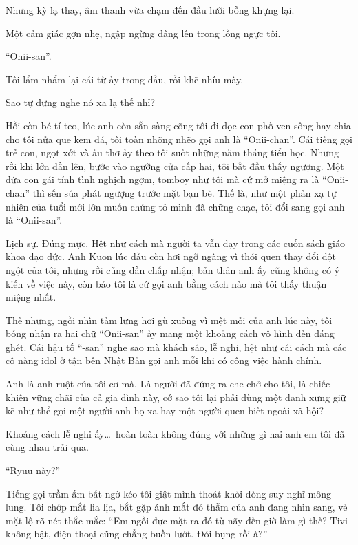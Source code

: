 ﻿\documentclass[../main.tex]{subfiles}
\begin{document}
Nhưng kỳ lạ thay, âm thanh vừa chạm đến đầu lưỡi bỗng khựng lại.

Một cảm giác gợn nhẹ, ngập ngừng dâng lên trong lồng ngực tôi.

``Onii-san''.

Tôi lẩm nhẩm lại cái từ ấy trong đầu, rồi khẽ nhíu mày.

Sao tự dưng nghe nó xa lạ thế nhỉ?

Hồi còn bé tí teo, lúc anh còn sẵn sàng cõng tôi đi dọc con phố ven sông hay chia cho tôi nửa que kem đá, tôi toàn nhõng nhẽo gọi anh là ``Onii-chan''. Cái tiếng gọi trẻ con, ngọt xớt và ấu thơ ấy theo tôi suốt những năm tháng tiểu học. Nhưng rồi khi lớn dần lên, bước vào ngưỡng cửa cấp hai, tôi bắt đầu thấy ngượng. Một đứa con gái tính tình nghịch ngợm, tomboy như tôi mà cứ mở miệng ra là ``Onii-chan'' thì sến súa phát ngượng trước mặt bạn bè. Thế là, như một phản xạ tự nhiên của tuổi mới lớn muốn chứng tỏ mình đã chững chạc, tôi đổi sang gọi anh là ``Onii-san''.

Lịch sự. Đúng mực. Hệt như cách mà người ta vẫn dạy trong các cuốn sách giáo khoa đạo đức. Anh Kuon lúc đầu còn hơi ngỡ ngàng vì thói quen thay đổi đột ngột của tôi, nhưng rồi cũng dần chấp nhận; bản thân anh ấy cũng không có ý kiến về việc này, còn bảo tôi là cứ gọi anh bằng cách nào mà tôi thấy thuận miệng nhất.

Thế nhưng, ngồi nhìn tấm lưng hơi gù xuống vì mệt mỏi của anh lúc này, tôi bỗng nhận ra hai chữ ``Onii-san'' ấy mang một khoảng cách vô hình đến đáng ghét. Cái hậu tố ``-san'' nghe sao mà khách sáo, lễ nghi, hệt như cái cách mà các cô nàng idol ở tận bên Nhật Bản gọi anh mỗi khi có công việc hành chính.

Anh là anh ruột của tôi cơ mà. Là người đã đứng ra che chở cho tôi, là chiếc khiên vững chãi của cả gia đình này, cớ sao tôi lại phải dùng một danh xưng giữ kẽ như thể gọi một người anh họ xa hay một người quen biết ngoài xã hội?

Khoảng cách lễ nghi ấy\dots\ hoàn toàn không đúng với những gì hai anh em tôi đã cùng nhau trải qua.

\ct

``Ryuu này?''

Tiếng gọi trầm ấm bất ngờ kéo tôi giật mình thoát khỏi dòng suy nghĩ mông lung. Tôi chớp mắt lia lịa, bắt gặp ánh mắt đỏ thẫm của anh đang nhìn sang, vẻ mặt lộ rõ nét thắc mắc: ``Em ngồi đực mặt ra đó từ nãy đến giờ làm gì thế? Tivi không bật, điện thoại cũng chẳng buồn lướt. Đói bụng rồi à?''
\end{document}
